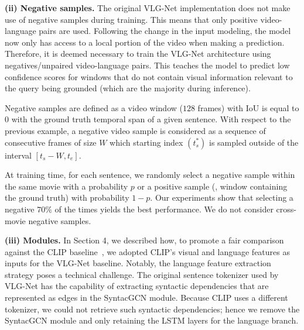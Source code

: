 \documentclass[10pt,twocolumn,letterpaper]{article}
\begin{document}
\textbf{(ii) Negative samples.} The original VLG-Net implementation does not make use of negative samples during training. This means that only positive video-language pairs are used. Following the change in the input modeling, the model now only has access to a local portion of the video when making a prediction. Therefore, it is deemed necessary to train the VLG-Net architecture using negatives/unpaired video-language pairs. 
This teaches the model to predict low confidence scores for windows that do not contain visual information relevant to the query being grounded (which are the majority during inference).

Negative samples are defined as a video window ($128$ frames) with IoU is equal to $0$ with the ground truth temporal span of a given sentence. 
With respect to the previous example, a negative video sample is considered as a sequence of consecutive frames of size $W$ which starting index $(t_s^*)$ is sampled outside of the interval $[t_s - W, t_e]$.

At training time, for each sentence, we randomly select a negative sample within the same movie with a probability $p$ or a positive sample (\ie, window containing the ground truth) with probability $1-p$. 
Our experiments show that selecting a negative $70\%$ of the times yields the best performance. 
We do not consider cross-movie negative samples. 
 
\textbf{(iii) Modules.} In Section 4, we described how, to promote a fair comparison against the CLIP baseline~\cite{radford2021learning}, we adopted CLIP's visual and language features as inputs for the VLG-Net baseline. Notably, the language feature extraction strategy poses a technical challenge.
The original sentence tokenizer used by VLG-Net has the capability of extracting syntactic dependencies that are represented as edges in the SyntacGCN module. Because CLIP uses a different tokenizer, we could not retrieve such syntactic dependencies; hence we remove the SyntacGCN module and only retaining the LSTM layers for the language branch.

 
\end{document}
